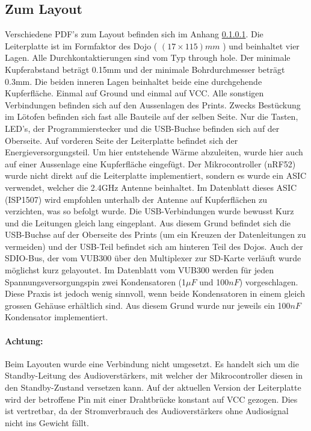 \newpage

\subsection{Zum Layout}
    Verschiedene PDF's zum Layout befinden sich im Anhang \ref{}.
    Die Leiterplatte ist im Formfaktor des Dojo ( \( (17\times 115)mm \) ) und beinhaltet vier Lagen. 
    Alle Durchkontaktierungen sind vom Typ through hole. 
    Der minimale Kupferabstand beträgt 0.15mm und der minimale Bohrdurchmesser beträgt 0.3mm.
    Die beiden inneren Lagen beinhaltet beide eine durchgehende Kupferfläche. 
    Einmal auf Ground und einmal auf VCC.
    Alle sonstigen Verbindungen befinden sich auf den Aussenlagen des Prints.
    Zwecks Bestückung im Lötofen befinden sich fast alle Bauteile auf der selben Seite. 
    Nur die Tasten, LED's, der Programmierstecker und die USB-Buchse befinden sich auf der Oberseite.
    Auf vorderen Seite der Leiterplatte befindet sich der Energieversorgungsteil. 
    Um hier entstehende Wärme abzuleiten, wurde hier auch auf einer Aussenlage eine Kupferfläche eingefügt.
    Der Mikrocontroller (nRF52) wurde nicht direkt auf die Leiterplatte implementiert, sondern es wurde ein ASIC verwendet, welcher die 2.4GHz Antenne beinhaltet.
    Im Datenblatt dieses ASIC (ISP1507) wird empfohlen unterhalb der Antenne auf Kupferflächen zu verzichten, was so befolgt wurde.
    Die USB-Verbindungen wurde bewusst Kurz und die Leitungen gleich lang eingeplant. 
    Aus diesem Grund befindet sich die USB-Buchse auf der Oberseite des Prints (um ein Kreuzen der Datenleitungen zu vermeiden) und der USB-Teil befindet sich am hinteren Teil des Dojos.
    Auch der SDIO-Bus, der vom VUB300 über den Multiplexer zur SD-Karte verläuft wurde möglichst kurz gelayoutet. 
    Im Datenblatt vom VUB300 werden für jeden Spannungsversorgungspin zwei Kondensatoren (1\(\mu F\) und 100\(nF\)) vorgeschlagen. 
    Diese Praxis ist jedoch wenig sinnvoll, wenn beide Kondensatoren in einem gleich grossen Gehäuse erhältlich sind.
    Aus diesem Grund wurde nur jeweils ein 100\(nF\) Kondensator implementiert. 
    
    \vspace{0.2cm}
    
    \paragraph{Achtung:} Beim Layouten wurde eine Verbindung nicht umgesetzt. Es handelt sich um die Standby-Leitung des Audioverstärkers, mit welcher der Mikrocontroller diesen in den Standby-Zustand versetzen kann.
    Auf der aktuellen Version der Leiterplatte wird der betroffene Pin mit einer Drahtbrücke konstant auf VCC gezogen. 
    Dies ist vertretbar, da der Stromverbrauch des Audioverstärkers ohne Audiosignal nicht ins Gewicht fällt.
    
